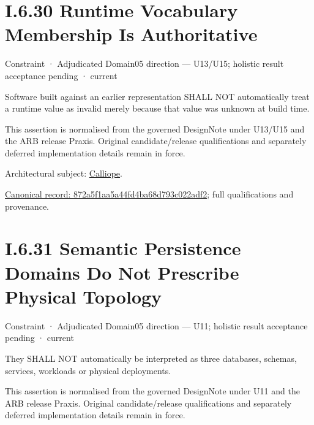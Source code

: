 \section*{I.6.30 Runtime Vocabulary Membership Is Authoritative}
\label{navigation:I.6.30}

\label{element:872a5f1aa5a44fd4ba68d793c022adf2}
{\small Constraint · Adjudicated Domain05 direction — U13/U15; holistic result acceptance pending · current}\par

Software built against an earlier representation SHALL NOT automatically
treat a runtime value as invalid merely because that value was unknown
at build time.



This assertion is normalised from the governed DesignNote under U13/U15 and the ARB release Praxis. Original candidate/release qualifications and separately deferred implementation details remain in force.



Architectural subject: \hyperref[element:466ad8f75a954c0581b5bba090443849]{Calliope}.


{\footnotesize \href{../../../../continuum/motivation/constraint/872a5f1aa5a44fd4ba68d793c022adf2.md}{Canonical record: 872a5f1aa5a44fd4ba68d793c022adf2}; full qualifications and provenance.}\par
\section*{I.6.31 Semantic Persistence Domains Do Not Prescribe Physical Topology}
\label{navigation:I.6.31}

\label{element:eca9a99c2ad44a1ea7833d2b0c5a3e93}
{\small Constraint · Adjudicated Domain05 direction — U11; holistic result acceptance pending · current}\par

They SHALL NOT automatically be interpreted as three databases, schemas, services, workloads or physical deployments.



This assertion is normalised from the governed DesignNote under U11 and the ARB release Praxis. Original candidate/release qualifications and separately deferred implementation details remain in force.



